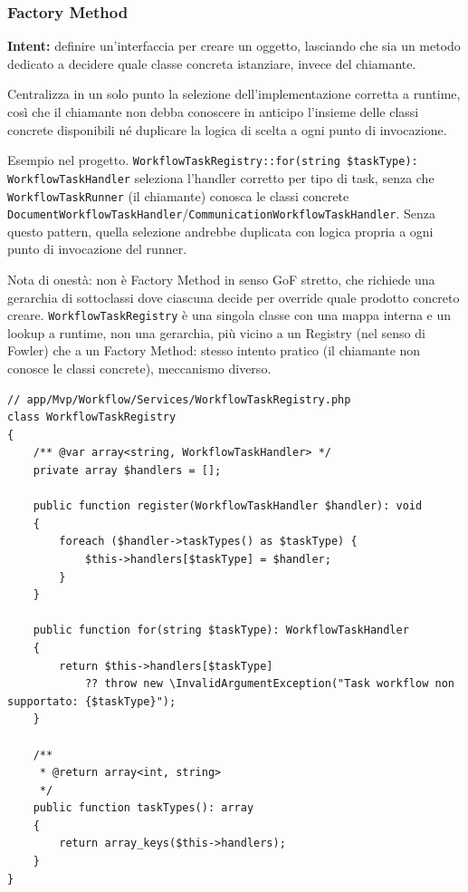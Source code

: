 \documentclass[a4paper,12pt]{article}
\begin{document}
\begin{sloppypar}
\subsubsection{Factory Method}

\textbf{Intent:} definire un'interfaccia per creare un oggetto, lasciando che sia un metodo dedicato a decidere quale classe concreta istanziare, invece del chiamante.

Centralizza in un solo punto la selezione dell'implementazione corretta a runtime, così che il chiamante non debba conoscere in anticipo l'insieme delle classi concrete disponibili né duplicare la logica di scelta a ogni punto di invocazione.

Esempio nel progetto. \texttt{WorkflowTaskRegistry::for(string \$taskType): WorkflowTaskHandler} seleziona l'handler corretto per tipo di task, senza che \texttt{WorkflowTaskRunner} (il chiamante) conosca le classi concrete \texttt{DocumentWorkflowTaskHandler}/\texttt{CommunicationWorkflowTaskHandler}. Senza questo pattern, quella selezione andrebbe duplicata con logica propria a ogni punto di invocazione del runner.

Nota di onestà: non è Factory Method in senso GoF stretto, che richiede una gerarchia di sottoclassi dove ciascuna decide per override quale prodotto concreto creare. \texttt{WorkflowTaskRegistry} è una singola classe con una mappa interna e un lookup a runtime, non una gerarchia, più vicino a un Registry (nel senso di Fowler) che a un Factory Method: stesso intento pratico (il chiamante non conosce le classi concrete), meccanismo diverso.

\begin{lstlisting}[style=phplisting, caption={WorkflowTaskRegistry: registrazione e lookup dell'handler per tipo di task}]
// app/Mvp/Workflow/Services/WorkflowTaskRegistry.php
class WorkflowTaskRegistry
{
    /** @var array<string, WorkflowTaskHandler> */
    private array $handlers = [];

    public function register(WorkflowTaskHandler $handler): void
    {
        foreach ($handler->taskTypes() as $taskType) {
            $this->handlers[$taskType] = $handler;
        }
    }

    public function for(string $taskType): WorkflowTaskHandler
    {
        return $this->handlers[$taskType]
            ?? throw new \InvalidArgumentException("Task workflow non supportato: {$taskType}");
    }

    /**
     * @return array<int, string>
     */
    public function taskTypes(): array
    {
        return array_keys($this->handlers);
    }
}
\end{lstlisting}


\end{sloppypar}
\end{document}
